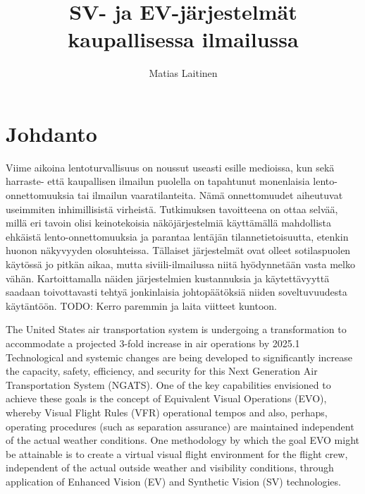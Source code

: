 \documentclass[utf8,bachelor,manualbib]{gradu3}
\begin{document}
\title{SV- ja EV-järjestelmät kaupallisessa ilmailussa}



\author{Matias Laitinen}

\maketitle
  
\mainmatter

\chapter{Johdanto}

Viime aikoina lentoturvallisuus on noussut useasti esille medioissa, kun sekä harraste- että kaupallisen ilmailun puolella on tapahtunut monenlaisia lento-onnettomuuksia tai ilmailun vaaratilanteita. Nämä onnettomuudet aiheutuvat useimmiten inhimillisistä virheistä. Tutkimuksen tavoitteena on ottaa selvää, millä eri tavoin olisi keinotekoisia näköjärjestelmiä käyttämällä mahdollista ehkäistä lento-onnettomuuksia ja parantaa lentäjän tilannetietoisuutta, etenkin huonon näkyvyyden olosuhteissa. Tällaiset järjestelmät ovat olleet sotilaspuolen käytössä jo pitkän aikaa, mutta siviili-ilmailussa niitä hyödynnetään vasta melko vähän. Kartoittamalla näiden järjestelmien kustannuksia ja käytettävyyttä saadaan toivottavasti tehtyä jonkinlaisia johtopäätöksiä niiden soveltuvuudesta käytäntöön. TODO: Kerro paremmin ja laita viitteet kuntoon.

The United States air transportation system is undergoing a transformation to accommodate a projected 3-fold
increase in air operations by 2025.1 Technological and systemic changes are being developed to significantly
increase the capacity, safety, efficiency, and security for this Next Generation Air Transportation System
(NGATS). One of the key capabilities envisioned to achieve these goals is the concept of Equivalent Visual
Operations (EVO), whereby Visual Flight Rules (VFR) operational tempos and also, perhaps, operating
procedures (such as separation assurance) are maintained independent of the actual weather conditions. One
methodology by which the goal EVO might be attainable is to create a virtual visual flight environment for
the flight crew, independent of the actual outside weather and visibility conditions, through application of
Enhanced Vision (EV) and Synthetic Vision (SV) technologies. \citep{baileyym2007}
\end{document}
